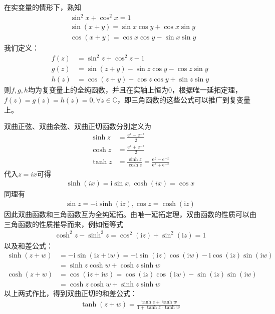 \begin{example}[三角函数]
    在实变量的情形下，熟知\begin{align*}
        &\sin^2 x+\cos^2 x=1\\
        &\sin(x+y)=\sin x\cos y+\cos x\sin y\\
        &\cos(x+y)=\cos x\cos y-\sin x\sin y
    \end{align*}
    我们定义：\begin{align*}
        f(z)&=\sin^2 z+\cos^2 z-1\\
        g(z)&=\sin(z+y)-\sin z\cos y-\cos z\sin y\\
        h(z)&=\cos(z+y)-\cos z\cos y+\sin z\sin y
    \end{align*}
    则$f,g,h$均为复变量上的全纯函数，并且在实轴上恒为0，根据唯一延拓定理，$f(z)=g(z)=h(z)=0,\forall z\in\mathbb{C}$，即三角函数的这些公式可以推广到复变量上。
\end{example}
\begin{example}[双曲函数]
    双曲正弦、双曲余弦、双曲正切函数分别定义为
    \begin{align*}
        \sinh z&=\frac{\mathrm{e}^z-\mathrm{e}^{-z}}{2}\\
        \cosh z&=\frac{\mathrm{e}^z+\mathrm{e}^{-z}}{2}\\
        \tanh z&=\frac{\sinh z}{\cosh z}=\frac{\mathrm{e}^z-\mathrm{e}^{-z}}{\mathrm{e}^z+\mathrm{e}^{-z}}
    \end{align*}
    代入$z=ix$可得
    \begin{align*}
        \sinh (ix)=\mathrm{i}\sin x,\cosh (ix)=\cos x
    \end{align*}
    同理有\begin{align*}
        \sin z=-\mathrm{i}\sinh (\mathrm{i}z),\cos z=\cosh (\mathrm{i}z)
    \end{align*}
    因此双曲函数和三角函数互为全纯延拓。由唯一延拓定理，双曲函数的性质可以由三角函数的性质推导而来，例如恒等式
    \begin{align*}
        \cosh^2 z-\sinh^2 z=\cos^2 (\mathrm{i}z)+\sin^2 (\mathrm{i}z)=1
    \end{align*}
    以及和差公式：
    \begin{align*}
        \sinh(z+w)&=-\mathrm{i}\sin(\mathrm{i}z+\mathrm{i}w)=-\mathrm{i}\sin(\mathrm{i}z)\cos(\mathrm{i}w)-\mathrm{i}\cos(\mathrm{i}z)\sin(\mathrm{i}w)\\
        &=\sinh z\cosh w+\cosh z\sinh w\\
        \cosh(z+w)&=\cos(\mathrm{i}z+\mathrm{i}w)=\cos(\mathrm{i}z)\cos(\mathrm{i}w)-\sin(\mathrm{i}z)\sin(\mathrm{i}w)\\
        &=\cosh z\cosh w+\sinh z\sinh w
    \end{align*}
    以上两式作比，得到双曲正切的和差公式：
    \begin{align*}
        \tanh(z+w)=\frac{\tanh z+\tanh w}{1+\tanh z\cdot\tanh w}
    \end{align*}
\end{example}
